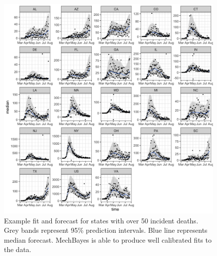 \documentclass[11pt]{amsart}
\begin{document}
\begin{figure}

    \includegraphics[scale=.2]{fit_and_forecast_results.png}

\caption{Example fit and forecast for states with over 50 incident deaths. Grey bands represent 95\% prediction intervals. Blue line represents median forecast. MechBayes is able to produce well calibrated fits to the data.}
\label{fig:fit_and_forecast_results}
\end{figure}

	
 
\end{document}
